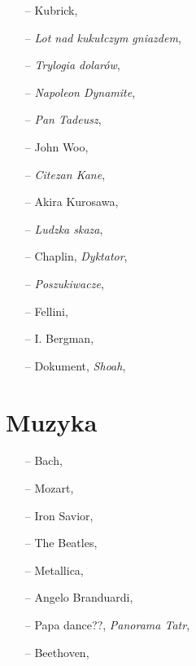 \documentclass[a4paper,11pt]{article}
\begin{document}
\begin{itemize}
\item[--] Kubrick,

\item[--] \textit{Lot nad kukułczym gniazdem},

\item[--] \textit{Trylogia dolarów},

\item[--] \textit{Napoleon Dynamite},

\item[--] \textit{Pan Tadeusz},

\item[--] John Woo,

\item[--] \textit{Citezan Kane},

\item[--] Akira Kurosawa,

\item[--] \textit{Ludzka skaza},

\item[--] Chaplin, \textit{Dyktator},

\item[--] \textit{Poszukiwacze},

\item[--] Fellini,

\item[--] I. Bergman,

\item[--] Dokument, \textit{Shoah},

\end{itemize}










\section{Muzyka}


\begin{itemize}
\item[--] Bach,

\item[--] Mozart,

\item[--] Iron Savior,

\item[--] The Beatles,

\item[--] Metallica,

\item[--] Angelo Branduardi,

\item[--] Papa dance??, \textit{Panorama Tatr},

\item[--] Beethoven,

\end{itemize}
\end{document}
